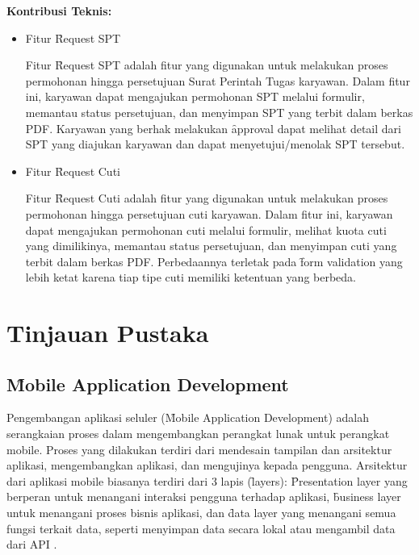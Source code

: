 \noindent\textbf{Kontribusi Teknis:}
\begin{itemize}
    \item Fitur \f{Request} SPT
    
    Fitur \f{Request} SPT adalah fitur yang digunakan untuk melakukan proses
    permohonan hingga persetujuan Surat Perintah Tugas karyawan. Dalam fitur
    ini, karyawan dapat mengajukan permohonan SPT melalui formulir, memantau
    status persetujuan, dan menyimpan SPT yang terbit dalam berkas PDF.
    Karyawan yang berhak melakukan \f{approval} dapat melihat detail dari SPT
    yang diajukan karyawan dan dapat menyetujui/menolak SPT tersebut.
    
    \item Fitur \f{Request} Cuti
    
    Fitur \f{Request} Cuti adalah fitur yang digunakan untuk melakukan proses
    permohonan hingga persetujuan cuti karyawan. Dalam fitur ini, karyawan
    dapat mengajukan permohonan cuti melalui formulir, melihat kuota cuti yang
    dimilikinya, memantau status persetujuan, dan menyimpan cuti yang terbit
    dalam berkas PDF. Perbedaannya terletak pada \f{form validation} yang lebih
    ketat karena tiap tipe cuti memiliki ketentuan yang berbeda.
\end{itemize}



\section{Tinjauan Pustaka}
\label{sec:tinjauanPustaka}

\subsection{\f{Mobile Application Development}}
\label{sec:mobileAppDev}
Pengembangan aplikasi seluler (\f{Mobile Application Development}) adalah
serangkaian proses dalam mengembangkan perangkat lunak untuk perangkat mobile.
Proses yang dilakukan terdiri dari mendesain tampilan dan arsitektur aplikasi,
mengembangkan aplikasi, dan mengujinya kepada pengguna. Arsitektur dari aplikasi
mobile biasanya terdiri dari 3 lapis (\f{layers}): \f{Presentation layer} yang
berperan untuk menangani interaksi pengguna terhadap aplikasi, \f{business layer}
untuk menangani proses bisnis aplikasi, dan \f{data layer} yang menangani semua
fungsi terkait data, seperti menyimpan data secara lokal atau mengambil data
dari API \citep{azure:mobile}.

